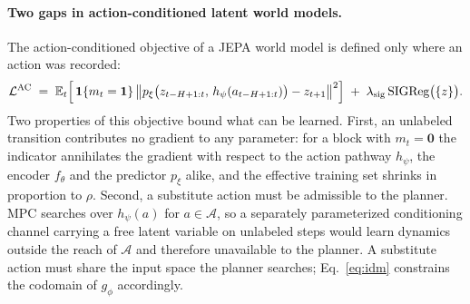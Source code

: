 \documentclass{article}
\begin{document}
\paragraph{Two gaps in action-conditioned latent world models.}
The action-conditioned objective of a JEPA world model is defined only where an
action was recorded:
\begin{equation}
  \mathcal{L}^{\mathrm{AC}}
  \;=\;
  \mathbb{E}_t\Bigl[\,
    \mathbf{1}\{m_t = \mathbf{1}\}\,
    \bigl\lVert
      p_\xi\bigl(z_{t-H+1:t},\, h_\psi(a_{t-H+1:t})\bigr) - z_{t+1}
    \bigr\rVert^{2}
  \Bigr]
  \;+\;
  \lambda_{\mathrm{sig}}\, \mathrm{SIGReg}\bigl(\{z\}\bigr).
  \label{eq:ac}
\end{equation}
Two properties of this objective bound what can be learned. First, an unlabeled
transition contributes no gradient to any parameter: for a block with
$m_t = \mathbf{0}$ the indicator annihilates the gradient with respect to the
action pathway $h_\psi$, the encoder $f_\theta$ and the predictor $p_\xi$ alike,
and the effective training set shrinks in proportion to $\rho$. Second, a
substitute action must be admissible to the planner. MPC searches over $h_\psi(a)$
for $a \in \mathcal{A}$, so a separately parameterized conditioning channel
carrying a free latent variable on unlabeled steps would learn dynamics outside the
reach of $\mathcal{A}$ and therefore unavailable to the planner. A substitute
action must share the input space the planner searches; Eq.~\ref{eq:idm} constrains
the codomain of $g_\phi$ accordingly.
\end{document}
